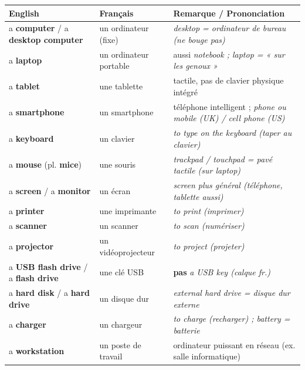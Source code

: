 \documentclass[11pt]{article}
\newcommand{\eng}[1]{\ifmmode\text{\textit{#1}}\else\begingroup\selectlanguage{english}\itshape #1\endgroup\fi}
\begin{document}
\begin{center}
\begin{tabularx}{\linewidth}{|X|X|X|}
\hline
\rowcolor{popblueL} \textbf{English} & \textbf{Français} & \textbf{Remarque / Prononciation} \\
\hline
a \textbf{computer} / a \textbf{desktop computer} & un ordinateur (fixe) & \eng{desktop} = ordinateur de bureau (ne bouge pas) \\
a \textbf{laptop} & un ordinateur portable & aussi \eng{notebook} ; \eng{laptop} = « sur les genoux » \\
a \textbf{tablet} & une tablette & tactile, pas de clavier physique intégré \\
a \textbf{smartphone} & un smartphone & téléphone intelligent ; \eng{phone} ou \eng{mobile} (UK) / \eng{cell phone} (US) \\
a \textbf{keyboard} & un clavier & \eng{to type on the keyboard} (taper au clavier) \\
a \textbf{mouse} (pl. \textbf{mice}) & une souris & \eng{trackpad} / \eng{touchpad} = pavé tactile (sur laptop) \\
a \textbf{screen} / a \textbf{monitor} & un écran & \eng{screen} plus général (téléphone, tablette aussi) \\
a \textbf{printer} & une imprimante & \eng{to print} (imprimer) \\
a \textbf{scanner} & un scanner & \eng{to scan} (numériser) \\
a \textbf{projector} & un vidéoprojecteur & \eng{to project} (projeter) \\
a \textbf{USB flash drive} / a \textbf{flash drive} & une clé USB & \textbf{pas} \eng{a USB key} (calque fr.) \\
a \textbf{hard disk} / a \textbf{hard drive} & un disque dur & \eng{external hard drive} = disque dur externe \\
a \textbf{charger} & un chargeur & \eng{to charge} (recharger) ; \eng{battery} = batterie \\
a \textbf{workstation} & un poste de travail & ordinateur puissant en réseau (ex. salle informatique) \\
\hline
\end{tabularx}
\end{center}
\end{document}
